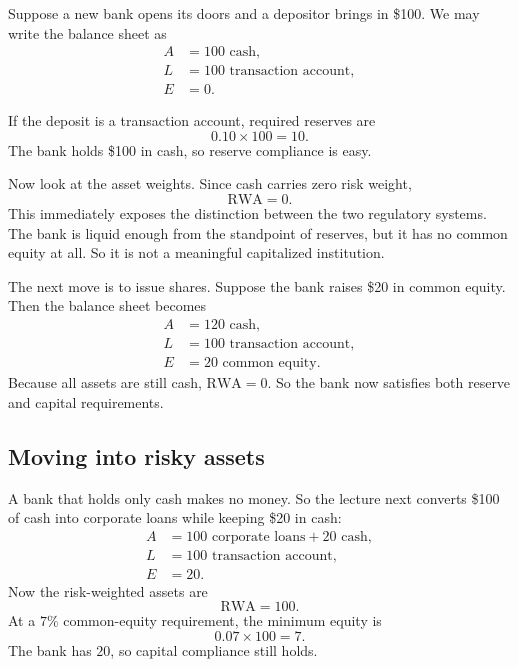 Suppose a new bank opens its doors and a depositor brings in \$100. We may write the balance sheet as
\begin{align}
A &= 100 \text{ cash}, \\
L &= 100 \text{ transaction account}, \\
E &= 0.
\end{align}

If the deposit is a transaction account, required reserves are
\begin{equation}
0.10 \times 100 = 10.
\end{equation}
The bank holds \$100 in cash, so reserve compliance is easy.

Now look at the asset weights. Since cash carries zero risk weight,
\begin{equation}
\text{RWA} = 0.
\end{equation}
This immediately exposes the distinction between the two regulatory systems. The bank is liquid enough from the standpoint of reserves, but it has no common equity at all. So it is not a meaningful capitalized institution.

The next move is to issue shares. Suppose the bank raises \$20 in common equity. Then the balance sheet becomes
\begin{align}
A &= 120 \text{ cash}, \\
L &= 100 \text{ transaction account}, \\
E &= 20 \text{ common equity}.
\end{align}
Because all assets are still cash, \(\text{RWA}=0\). So the bank now satisfies both reserve and capital requirements.

\subsection{Moving into risky assets}

A bank that holds only cash makes no money. So the lecture next converts \$100 of cash into corporate loans while keeping \$20 in cash:
\begin{align}
A &= 100 \text{ corporate loans} + 20 \text{ cash}, \\
L &= 100 \text{ transaction account}, \\
E &= 20.
\end{align}
Now the risk-weighted assets are
\begin{equation}
\text{RWA} = 100.
\end{equation}
At a \(7\%\) common-equity requirement, the minimum equity is
\begin{equation}
0.07 \times 100 = 7.
\end{equation}
The bank has \(20\), so capital compliance still holds.

